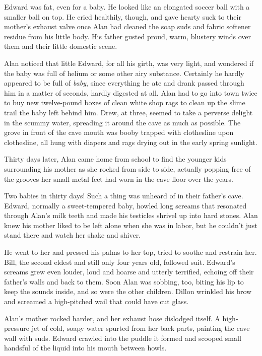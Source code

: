 \documentclass{article}
\begin{document}
Edward was fat, even for a baby.  He looked like an elongated soccer
ball with a smaller ball on top.  He cried healthily, though, and gave
hearty suck to their mother's exhaust valve once Alan had cleaned the
soap suds and fabric softener residue from his little body.  His
father gusted proud, warm, blustery winds over them and their little
domestic scene.

Alan noticed that little Edward, for all his girth, was very light,
and wondered if the baby was full of helium or some other airy
substance.  Certainly he hardly appeared to be full of \textit{baby},
since everything he ate and drank passed through him in a matter of
seconds, hardly digested at all.  Alan had to go into town twice to
buy new twelve-pound boxes of clean white shop rags to clean up the
slime trail the baby left behind him.  Drew, at three, seemed to take
a perverse delight in the scummy water, spreading it around the cave
as much as possible.  The grove in front of the cave mouth was booby
trapped with clothesline upon clothesline, all hung with diapers and
rags drying out in the early spring sunlight.

Thirty days later, Alan came home from school to find the younger kids
surrounding his mother as she rocked from side to side, actually
popping free of the grooves her small metal feet had worn in the cave
floor over the years.

Two babies in thirty days!  Such a thing was unheard of in their
father's cave.  Edward, normally a sweet-tempered baby, howled long
screams that resonated through Alan's milk teeth and made his
testicles shrivel up into hard stones.  Alan knew his mother liked to
be left alone when she was in labor, but he couldn't just stand there
and watch her shake and shiver.

He went to her and pressed his palms to her top, tried to soothe and
restrain her.  Bill, the second eldest and still only four years old,
followed suit.  Edward's screams grew even louder, loud and hoarse and
utterly terrified, echoing off their father's walls and back to them. 
Soon Alan was sobbing, too, biting his lip to keep the sounds inside,
and so were the other children.  Dillon wrinkled his brow and screamed
a high-pitched wail that could have cut glass.

Alan's mother rocked harder, and her exhaust hose dislodged itself.  A
high-pressure jet of cold, soapy water spurted from her back parts,
painting the cave wall with suds.  Edward crawled into the puddle it
formed and scooped small handsful of the liquid into his mouth between
howls.
\end{document}

